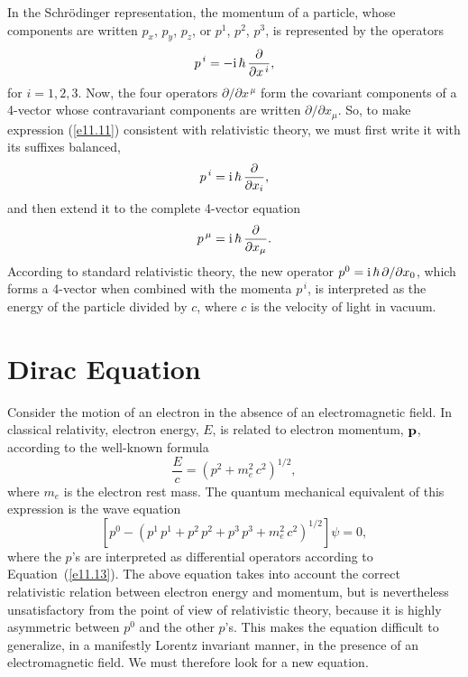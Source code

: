 In the Schr\"{o}dinger representation, the momentum of a particle, whose components are written $p_x$, $p_y$, $p_z$, or $p^1$, $p^2$, $p^3$, 
is represented by the operators
\begin{equation}\label{e11.11}
p^{\,i} = -{\rm i}\,\hbar\,\frac{\partial}{\partial x^{\,i}},
\end{equation}
for $i=1,2,3$. Now, the four operators $\partial/\partial x^{\,\mu}$ form the covariant components of a
4-vector whose contravariant components are written $\partial /\partial x_{\mu}$. So, to make
expression (\ref{e11.11}) consistent with relativistic theory,  we must first write it with its
suffixes balanced,
\begin{equation}
p^{\,i} = {\rm i}\,\hbar\,\frac{\partial}{\partial x_i},
\end{equation}
and then extend it to the complete 4-vector equation
\begin{equation}\label{e11.13}
p^{\,\mu} =  {\rm i}\,\hbar\,\frac{\partial}{\partial x_{\mu}}.
\end{equation}
According to standard relativistic theory, the new operator $p^0={\rm i}\,\hbar\,\partial/\partial x_0$, which forms a 4-vector when
combined with the momenta $p^{\,i}$, is interpreted as the energy of the particle divided by $c$, where $c$ is the velocity of
light in vacuum.

\section{Dirac Equation}
Consider the motion of an electron in the absence of an electromagnetic field. In classical relativity, 
electron energy, $E$, is related to  electron momentum, ${\bf p}$,  according to the well-known formula
\begin{equation}
\frac{E}{c}=(p^2+ m_e^2\,c^2)^{1/2},
\end{equation}
where $m_e$ is the electron rest mass. 
The quantum mechanical equivalent of this expression is the wave equation
\begin{equation}\label{e11.15}
\left[p^0  - (p^1\,p^1+p^2\,p^2+p^3\,p^3+m_e^2\,c^2)^{1/2}\right]\psi = 0,
\end{equation}
where the $p$'s are interpreted as differential operators according to Equation~(\ref{e11.13}). The above equation
takes into account the correct relativistic relation between electron energy and momentum, but is nevertheless unsatisfactory from the
point of view of relativistic theory, because it is highly asymmetric between  $p^0$ and the other $p$'s. This  makes the equation
difficult to generalize, in a manifestly Lorentz  invariant manner, in the presence of an electromagnetic  field. We must therefore look for a new equation. 

